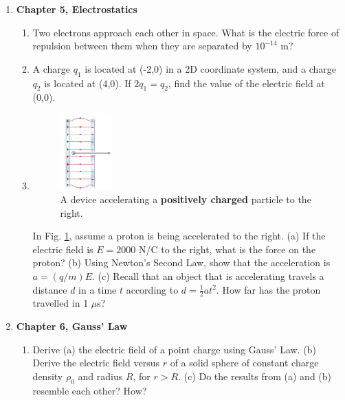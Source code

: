 \documentclass[10pt]{article}
\begin{document}
\clearpage

\begin{enumerate}
\item \textbf{Chapter 5, Electrostatics}
\begin{enumerate}
\item Two electrons approach each other in space.  What is the electric force of repulsion between them when they are separated by $10^{-14}$ m? \\ \vspace{1cm}
\item A charge $q_1$ is located at (-2,0) in a 2D coordinate system, and a charge $q_2$ is located at (4,0).  If $2 q_1 = q_2$, find the value of the electric field at (0,0). \\ \vspace{2cm}
\item 
\begin{figure}
\centering
\includegraphics[width=0.2\textwidth]{figures/cap.png}
\caption{\label{fig:cap} A device accelerating a \textbf{positively charged} particle to the right.}
\end{figure}
In Fig. \ref{fig:cap}, assume a proton is being accelerated to the right.  (a) If the electric field is $E = 2000$ N/C to the right, what is the force on the proton?  (b) Using Newton's Second Law, show that the acceleration is $a = (q/m) E$.  (c)  Recall that an object that is accelerating travels a distance $d$ in a time $t$ according to $d = \frac{1}{2}at^2$.  How far has the proton travelled in 1 $\mu$s? \\ \vspace{3cm}
\end{enumerate}
\item \textbf{Chapter 6, Gauss' Law}
\begin{enumerate}
\item Derive (a) the electric field of a point charge using Gauss' Law.  (b) Derive the electric field versus $r$ of a solid sphere of constant charge density $\rho_0$ and radius $R$, for $r>R$.  (c) Do the results from (a) and (b) resemble each other? How? \\ \vspace{3cm}

\end{enumerate}
\end{enumerate}
\end{document}
